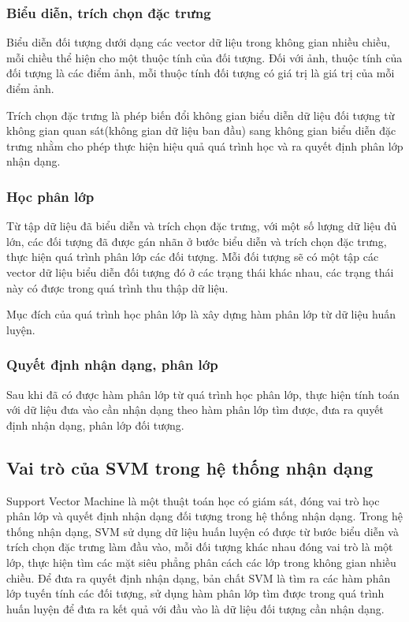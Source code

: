 \documentclass[12pt,a4paper]{article}
\begin{document}
\subsubsection{Biểu diễn, trích chọn đặc trưng}
Biểu diễn đối tượng dưới dạng các vector dữ liệu trong không gian nhiều chiều, mỗi chiều thể hiện cho một thuộc tính của đối tượng. Đối với ảnh, thuộc tính của đối tượng là các điểm ảnh, mỗi thuộc tính đối tượng có giá trị là giá trị của mỗi điểm ảnh. \par 
Trích chọn đặc trưng là phép biến đổi không gian biểu diễn dữ liệu đối tượng từ không gian quan sát(không gian dữ liệu ban đầu) sang không gian biểu diễn đặc trưng nhằm cho phép thực hiện hiệu quả quá trình học và ra quyết định phân lớp nhận dạng. 
\subsubsection{Học phân lớp}
Từ tập dữ liệu đã biểu diễn và trích chọn đặc trưng, với một số lượng dữ liệu đủ lớn, các đối tượng đã được gán nhãn ở bước biểu diễn và trích chọn đặc trưng, thực hiện quá trình phân lớp các đối tượng. Mỗi đối tượng sẽ có một tập các vector dữ liệu biểu diễn đối tượng đó ở các trạng thái khác nhau, các trạng thái này có được trong quá trình thu thập dữ liệu. \par 
Mục đích của quá trình học phân lớp là xây dựng hàm phân lớp từ dữ liệu huấn luyện. 
\subsubsection{Quyết định nhận dạng, phân lớp}
Sau khi đã có được hàm phân lớp từ quá trình học phân lớp, thực hiện tính toán với dữ liệu đưa vào cần nhận dạng theo hàm phân lớp tìm được, đưa ra quyết định nhận dạng, phân lớp đối tượng. 

\subsection{Vai trò của SVM trong hệ thống nhận dạng}
Support Vector Machine là một thuật toán học có giám sát, đóng vai trò học phân lớp và quyết định nhận dạng đối tượng trong hệ thống nhận dạng. Trong hệ thống nhận dạng, SVM sử dụng dữ liệu huấn luyện có được từ bước biểu diễn và trích chọn đặc trưng làm đầu vào, mỗi đối tượng khác nhau đóng vai trò là một lớp, thực hiện tìm các mặt siêu phẳng phân cách các lớp trong không gian nhiều chiều. Để đưa ra quyết định nhận dạng, bản chất SVM là tìm ra các hàm phân lớp tuyến tính các đối tượng, sử dụng hàm phân lớp tìm được trong quá trình huấn luyện để đưa ra kết quả với đầu vào là dữ liệu đối tượng cần nhận dạng. 
\end{document}
